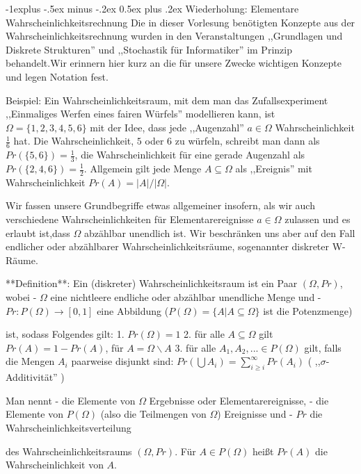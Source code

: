 \documentclass[a4paper]{article}
\makeatletter
\renewcommand{\subsection}{\@startsection{subsection}{2}{0mm}%
 {-1explus -.5ex minus -.2ex}%
 {0.5ex plus .2ex}%
 {\normalfont\normalsize\bfseries}}
\makeatother
\begin{document}
\begin{multicols}{3}
    \subsection{Wiederholung: Elementare Wahrscheinlichkeitsrechnung}
    Die in dieser Vorlesung benötigten Konzepte aus der Wahrscheinlichkeitsrechnung wurden in den Veranstaltungen ,,Grundlagen und Diskrete Strukturen'' und ,,Stochastik für Informatiker'' im Prinzip behandelt.Wir erinnern hier kurz an die für unsere Zwecke wichtigen Konzepte und legen Notation fest.

    Beispiel: Ein Wahrscheinlichkeitsraum, mit dem man das Zufallsexperiment ,,Einmaliges Werfen eines fairen Würfels'' modellieren kann, ist $\Omega=\{ 1 , 2 , 3 , 4 , 5 , 6\}$ mit der Idee, dass jede  ,,Augenzahl'' $a\in\Omega$ Wahrscheinlichkeit $\frac{1}{6}$ hat. Die Wahrscheinlichkeit, $5$ oder $6$ zu würfeln, schreibt man dann als $Pr(\{5,6\})=\frac{1}{3}$, die Wahrscheinlichkeit für eine gerade Augenzahl als $Pr(\{2,4,6\})=\frac{1}{2}$. Allgemein gilt jede Menge $A\subseteq\Omega$ als ,,Ereignis''  mit Wahrscheinlichkeit $Pr(A) =|A|/|\Omega|$.

    Wir fassen unsere Grundbegriffe etwas allgemeiner insofern, als wir auch verschiedene Wahrscheinlichkeiten für Elementarereignisse $a\in\Omega$ zulassen und es erlaubt ist,dass $\Omega$ abzählbar unendlich ist. Wir beschränken uns aber auf den Fall endlicher oder abzählbarer Wahrscheinlichkeitsräume, sogenannter diskreter W-Räume.

    **Definition**: Ein (diskreter) Wahrscheinlichkeitsraum ist ein Paar $(\Omega,Pr)$, wobei
    - $\Omega$ eine nichtleere endliche oder abzählbar unendliche Menge und
    - $Pr:P(\Omega)\rightarrow[0,1]$ eine Abbildung ($P(\Omega)=\{A|A\subseteq\Omega\}$ ist die Potenzmenge)

    ist, sodass Folgendes gilt:
    1. $Pr(\Omega) = 1$
    2. für alle $A\subseteq\Omega$ gilt $Pr(A)=1-Pr(A)$, für $A=\Omega\backslash A$
    3. für alle $A_1,A_2,...\in P(\Omega)$ gilt, falls die Mengen $A_i$ paarweise disjunkt sind: $Pr(\bigcup A_i)=\sum_{i\geq i}^{\infty} Pr(A_i)$ ( ,,$\sigma$-Additivität'' )

    Man nennt
    - die Elemente von $\Omega$ Ergebnisse oder Elementarereignisse,
    - die Elemente von $P(\Omega)$ (also die Teilmengen von $\Omega$) Ereignisse und
    - $Pr$ die Wahrscheinlichkeitsverteilung

    des Wahrscheinlichkeitsraums $(\Omega,Pr)$. Für $A\in P(\Omega)$ heißt $Pr(A)$ die Wahrscheinlichkeit von $A$.


\end{multicols}
\end{document}
